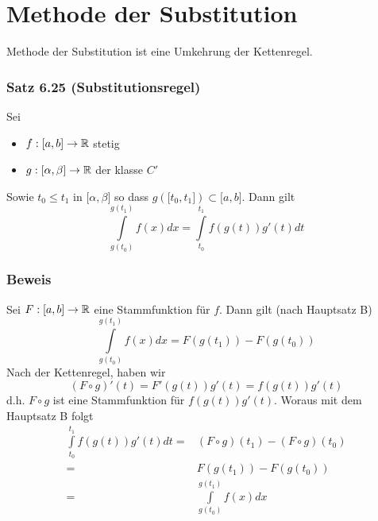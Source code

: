 \section{Methode der Substitution}
Methode der Substitution ist eine Umkehrung der Kettenregel.
\subsubsection*{Satz 6.25 (Substitutionsregel)}
Sei 
\begin{itemize}
\item $f:\lbrack a,b\rbrack\to\mathbb{R}$ stetig
\item $g:\lbrack\alpha,\beta\rbrack\to\mathbb{R}$ der klasse $C'$
\end{itemize}
Sowie $t_0\leq t_1$ in $\lbrack\alpha,\beta\rbrack$ so dass $g\left(\lbrack t_0, t_1\rbrack\right)\subset\lbrack a,b\rbrack$.
Dann gilt 
\[\int\limits_{g({t_0})}^{g({t_1})} {f(x)dx = \int\limits_{{t_0}}^{{t_1}} {f\left( {g\left( t \right)} \right)g'\left( t \right)dt} } \]

\subsubsection*{Beweis}
Sei $F:\lbrack a,b\rbrack\to\mathbb{R}$ eine Stammfunktion für $f$. Dann gilt (nach Hauptsatz B)
\[\int\limits_{g({t_0})}^{g({t_1})} {f(x)dx = F\left( {g({t_1})} \right)}  - F\left( {g({t_0})} \right)\]
Nach der Kettenregel, haben wir
\[(F \circ g)'(t) = F'(g(t))g'(t) = f(g(t))g'(t)\]
d.h. $F\circ g$ ist eine Stammfunktion für $f(g(t))g'(t)$. Woraus mit dem Hauptsatz B folgt 
\begin{align*}
\int\limits_{{t_0}}^{{t_1}} {f\left( {g(t)} \right)} g'(t)dt =&\left( {F \circ g} \right)({t_1}) - \left( {F \circ g} \right)({t_0})\\
 =&F\left( {g({t_1})} \right) - F\left( {g({t_0})} \right)\\
 =&\int\limits_{g({t_0})}^{g({t_1})} {f(x)dx} 
\end{align*}

